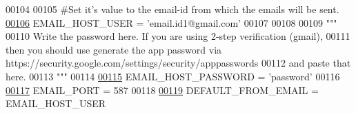 \begin{DoxyCode}
00104 
00105 \textcolor{comment}{#Set it's value to the email-id from which the emails will be sent.}
\hypertarget{settings_8py_source_l00106}{}\hyperlink{namespacesage_1_1settings_a9c01855359753a3c3f517341806347c2}{00106} EMAIL\_HOST\_USER = \textcolor{stringliteral}{'email.id1@gmail.com'}
00107 
00108 
00109 \textcolor{stringliteral}{"""}
00110 \textcolor{stringliteral}{Write the password here. If you are using 2-step verification (gmail),}
00111 \textcolor{stringliteral}{then you should use generate the app password via
       https://security.google.com/settings/security/apppasswords}
00112 \textcolor{stringliteral}{and paste that here.}
00113 \textcolor{stringliteral}{"""}
00114 
\hypertarget{settings_8py_source_l00115}{}\hyperlink{namespacesage_1_1settings_a66e7a16ed6b0df5716a6579fcba949a6}{00115} EMAIL\_HOST\_PASSWORD = \textcolor{stringliteral}{'password'}
00116 
\hypertarget{settings_8py_source_l00117}{}\hyperlink{namespacesage_1_1settings_a3fe927460bba6408b5df39fa8a10d367}{00117} EMAIL\_PORT = 587
00118 
\hypertarget{settings_8py_source_l00119}{}\hyperlink{namespacesage_1_1settings_a6517c4f93850d63e2bdbe7040ad0e2ff}{00119} DEFAULT\_FROM\_EMAIL = EMAIL\_HOST\_USER
\end{DoxyCode}
